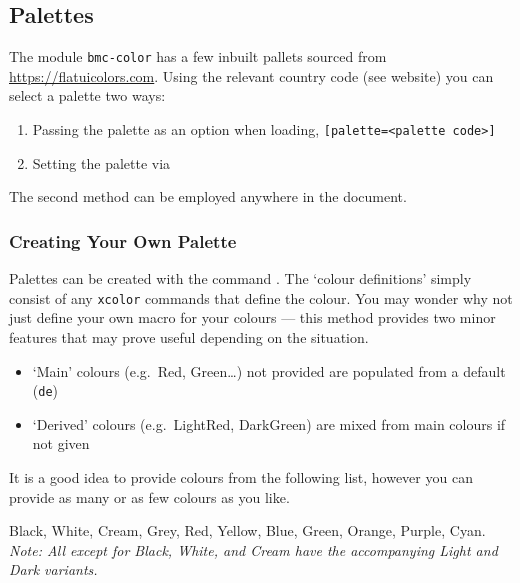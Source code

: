 \documentclass[solid,math,chem,code,plot,gloss]{bmc}
\begin{document}
\subsection{Palettes}
\label{subsec:palettes}
The module \texttt{bmc-color} has a few inbuilt pallets
sourced from \url{https://flatuicolors.com}.
Using the relevant country code (see website) you can select a palette two ways:
\begin{enumerate}
    \item Passing the palette as an option when loading, \texttt{[palette=<palette code>]}
    \item Setting the palette via \texttt{}
\end{enumerate}
The second method can be employed anywhere in the document.

\subsubsection{Creating Your Own Palette}

Palettes can be created with the command \texttt{}.
The `colour definitions' simply consist of any \texttt{xcolor} commands that define the colour.
You may wonder why not just define your own macro for your colours ---
this method provides two minor features that may prove useful depending on the situation.
\begin{itemize}
    \item `Main' colours (e.g.\ Red, Green\dots) not provided are populated from a default (\texttt{de})
    \item `Derived' colours (e.g.\ LightRed, DarkGreen) are mixed from main colours if not given
\end{itemize}
It is a good idea to provide colours from the following list, however you can provide as many or as few
colours as you like.

\begin{center}
    \selectfont
    \textcolor{Black!50!text}{Black},
    \textcolor{White!50!text}{White},
    \textcolor{Cream!50!text}{Cream},
    \textcolor{Grey!50!text}{Grey},
    \textcolor{Red!50!text}{Red},
    \textcolor{Yellow!50!text}{Yellow},
    \textcolor{Blue!50!text}{Blue},
    \textcolor{Green!50!text}{Green},
    \textcolor{Orange!50!text}{Orange},
    \textcolor{Purple!50!text}{Purple},
    \textcolor{Cyan!50!text}{Cyan}.
    \\[0.5ex]
    \selectfont
    \upshape\scriptsize\slshape
    Note: All except for Black, White, and Cream have the
    accompanying Light and Dark variants.
\end{center}
\end{document}
